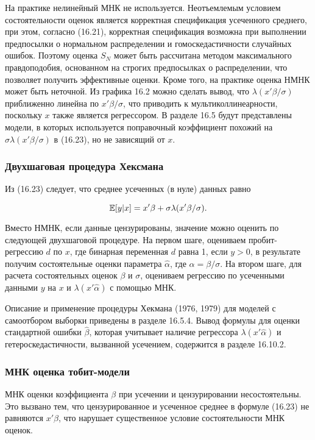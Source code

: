 На практике нелинейный МНК не используется. Неотъемлемым условием состоятельности оценок является корректная спецификация усеченного среднего, при этом, согласно (16.21), корректная спецификация возможна при выполнении предпосылки о нормальном распределении и гомоскедастичности случайных ошибок. Поэтому оценка $S_N$ может быть рассчитана методом максимального правдоподобия, основанном на строгих предпосылках о распределении, что позволяет получить эффективные оценки. Кроме того, на практике оценка НМНК может быть неточной. Из графика 16.2 можно сделать вывод, что $\lambda(x'\beta/\sigma)$ приближенно линейна по $x'\beta/\sigma$, что приводить к мультиколлинеарности, поскольку $x$ также является регрессором. В разделе 16.5 будут представлены модели, в которых используется поправочный коэффициент похожий на $\sigma\lambda(x'\beta/\sigma)$ в (16.23), но не зависящий от $x$.


\subsubsection*{Двухшаговая процедура Хексмана}

Из (16.23) следует, что среднее усеченных (в нуле) данных  равно

\begin{equation}
\mathbb{E}[y|x]=x'\beta+\sigma\lambda(x'\beta/\sigma).
\end{equation}

Вместо НМНК, если данные цензурированы, значение можно оценить по следующей двухшаговой процедуре. На первом шаге, оцениваем пробит-регрессию $d$ по $x$, где бинарная переменная $d$ равна 1, если $y>0$, в результате получим состоятельные оценки параметра $\hat{\alpha}$, где $\alpha=\beta/\sigma$. На втором шаге, для расчета состоятельных оценок $\beta$ и $\sigma$, оцениваем регрессию по усеченными данными $y$ на $x$ и $\lambda(x'\hat{\alpha})$ с помощью МНК.

Описание и применение процедуры Хекмана (1976, 1979) для моделей с самоотбором выборки приведены  в разделе 16.5.4. 
Вывод формулы для оценки стандартной ошибки $\hat{\beta}$, которая учитывает наличие регрессора $\lambda(x'\hat{\alpha})$ и  гетероскедастичности, вызванной усечением, содержится в разделе 16.10.2.

\subsubsection*{МНК оценка тобит-модели}

МНК оценки коэффициента $\beta$ при усечении и цензурировании несостоятельны. Это вызвано тем, что цензурированное и усеченное среднее в формуле (16.23) не равняются $x'\beta$, что нарушает существенное условие состоятельности МНК оценок.

